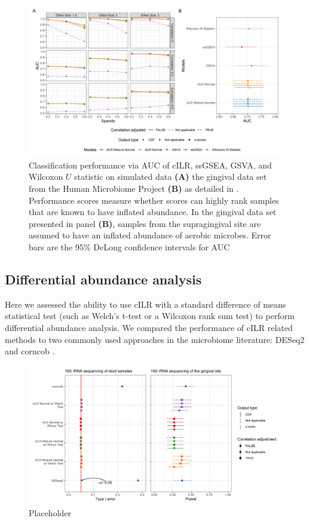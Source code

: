 \documentclass{article}
\begin{document}
\begin{figure}[H]
    \centering
    \includegraphics[width = \textwidth]{figures/sim_data_ss_auc.png}
    \caption{Classification performance via AUC of cILR, ssGSEA, GSVA, and Wilcoxon $U$ statistic on simulated data \textbf{(A)} the gingival data set from the Human Microbiome Project  \textbf{(B)} as detailed in . Performance scores measure whether scores can highly rank samples that are known to have inflated abundance. In the gingival data set presented in panel \textbf{(B)}, samples from the supragingival site are assumed to have an inflated abundance of aerobic microbes. Error bars are the 95\% DeLong confidence intervals for AUC \cite{delong1988}} 
    \label{fig:3}
\end{figure}

\subsection*{Differential abundance analysis}
Here we assessed the ability to use cILR with a standard difference of means statistical test (such as Welch's t-test or a Wilcoxon rank sum test) to perform differential abundance analysis. We compared the performance of cILR related methods to two commonly used approaches in the microbiome literature: DESeq2 \cite{love2014} and corncob \cite{martin2020}.   

\begin{figure}[H]
    \centering
    \includegraphics[width = \textwidth]{figures/data_diff_ab.png}
    \caption{Placeholder} 
    \label{fig:4}
\end{figure}
\end{document}
